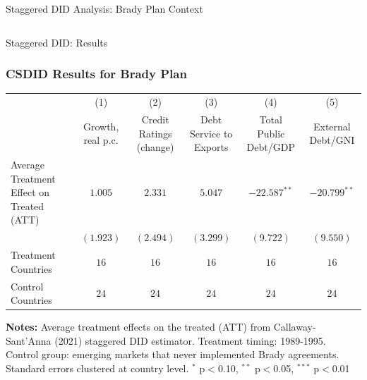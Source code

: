 \documentclass{beamer}
\begin{document}
\begin{frame}{Staggered DID Analysis: Brady Plan Context}
\begin{columns}
\begin{column}{0.45\textwidth}
    \end{column}
  \end{columns}
\end{frame}

\begin{frame}{Staggered DID: Results}
  \frametitle{CSDID Results for Brady Plan}
  \begin{table}[ht!]\centering
  \renewcommand{\arraystretch}{1.1}
  \footnotesize
  \begin{tabular}{@{}p{2.2cm}ccccc@{}}
  \toprule
              &(1)&(2)&(3)&(4)&(5)\\
              &\parbox{1.2cm}{\centering\footnotesize Growth, real p.c.}&\parbox{1.2cm}{\centering\footnotesize Credit Ratings (change)}&\parbox{1.2cm}{\centering\footnotesize Debt Service to Exports}&\parbox{1.2cm}{\centering\footnotesize Total Public Debt/GDP}&\parbox{1.2cm}{\centering\footnotesize External Debt/GNI}\\
  \midrule
  \parbox{2.2cm}{\raggedright\footnotesize Average Treatment Effect on Treated (ATT)}&  $1.005$  &  $2.331$  &  $5.047$  &  $-22.587^{**}$  &  $-20.799^{**}$  \\
              &  $(1.923)$  &  $(2.494)$ & $(3.299)$   &  $(9.722)$   &  $(9.550)$  \\
  [0.3em]
  \midrule
  Treatment Countries&       $16$   &       $16$   &       $16$   &       $16$   &       $16$   \\
  Control Countries   &       $24$   &       $24$   &       $24$   &       $24$   &       $24$   \\
  \bottomrule
  \end{tabular}
  \end{table}
  \vspace{0.3cm}
  \begin{footnotesize}
  \textbf{Notes:} Average treatment effects on the treated (ATT) from Callaway-Sant'Anna (2021) staggered DID estimator. Treatment timing: 1989-1995. Control group: emerging markets that never implemented Brady agreements. Standard errors clustered at country level. $^*$ p$<$0.10, $^{**}$ p$<$0.05, $^{***}$ p$<$0.01
  \end{footnotesize}
\end{frame}
\end{document}
